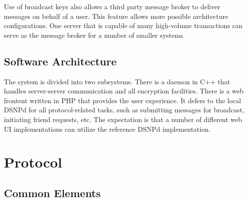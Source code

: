 \documentclass[letterpaper,11pt,oneside]{article}
\begin{document}
Use of broadcast keys also allows a third party message broker to deliver
messages on behalf of a user. This feature allows more possible architecture
configurations. One server that is capable of many high-volume transactions can
serve as the message broker for a number of smaller systems.

%
%

\subsection{Software Architecture}

The system is divided into two subsystems. There is a daemon in C++ that
handles server-server communication and all encryption facilities. There is a
web frontent written in PHP that provides the user experience. It defers to the
local DSNPd for all protocol-related tasks, such as submitting messages for
broadcast, initiating friend requests, etc. The expectation is that a number of
different web UI implementations can utilize the reference DSNPd
implementation.

\section{Protocol}

\subsection{Common Elements}
\end{document}
